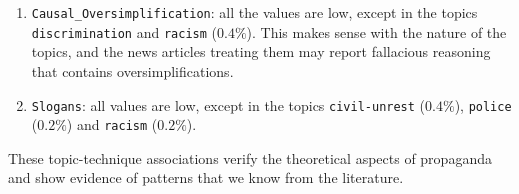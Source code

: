 \begin{enumerate}
    \item \texttt{Causal\_Oversimplification}: all the values are low, except in the topics \texttt{discrimination} and \texttt{racism} ($0.4\%$). This makes sense with the nature of the topics, and the news articles treating them may report fallacious reasoning that contains oversimplifications.
    \item \texttt{Slogans}: all values are low, except in the topics \texttt{civil-unrest} ($0.4\%$), \texttt{police} ($0.2\%$) and \texttt{racism} ($0.2\%$).
\end{enumerate}

These topic-technique associations verify the theoretical aspects of propaganda and show evidence of patterns that we know from the literature.










